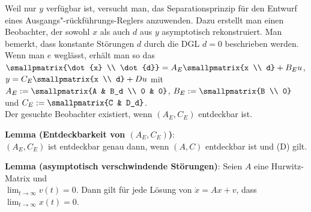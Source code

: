Weil nur $y$ verfügbar ist, versucht man, das Separationsprinzip für den Entwurf eines
Ausgangs"-rückführungs-Reglers anzuwenden.
Dazu erstellt man einen Beobachter, der sowohl $x$ als auch $d$ aus $y$ asymptotisch rekonstruiert.
Man bemerkt, dass konstante Störungen $d$ durch die DGL $\dot{d} = 0$ beschrieben werden.\\
Wenn man $e$ weglässt, erhält man so das \\
$\smallpmatrix{\dot{x} \\ \dot{d}} = A_E \smallpmatrix{x \\ d} + B_E u$,
$y = C_E \smallpmatrix{x \\ d} + Du$ mit
$A_E := \smallpmatrix{A & B_d \\ 0 & 0}$,
$B_E := \smallpmatrix{B \\ 0}$ und
$C_E := \smallpmatrix{C & D_d}$.\\
Der gesuchte Beobachter existiert, wenn $(A_E, C_E)$ entdeckbar ist.

\textbf{Lemma (Entdeckbarkeit von $(A_E, C_E)$)}:\\
$(A_E, C_E)$ ist entdeckbar genau dann, wenn
$(A, C)$ entdeckbar ist und (D) gilt.

\textbf{Lemma (asymptotisch verschwindende Störungen)}:
Seien $A$ eine Hurwitz-Matrix und\\
$\lim_{t \to \infty} v(t) = 0$.
Dann gilt für jede Lösung von $\dot{x} = Ax + v$, dass $\lim_{t \to \infty} x(t) = 0$.

\linie

